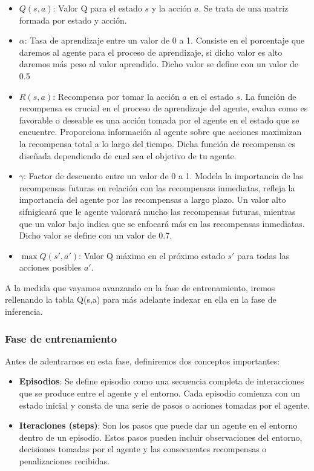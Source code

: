   \begin{itemize}
    \item \textbf{$Q(s, a)$}: Valor Q para el estado $s$ y la acción $a$. Se trata de una matriz formada por estado y acción.
    \item \textbf{$\alpha$}: Tasa de aprendizaje entre un valor de 0 a 1. Consiste en el porcentaje que daremos al agente para el proceso de aprendizaje, 
    si dicho valor es alto daremos más peso al valor aprendido. Dicho valor se define con un valor de 0.5 
    \item \textbf{$R(s, a)$}: Recompensa por tomar la acción $a$ en el estado $s$. La función de recompensa es crucial en el proceso de aprendizaje del agente, evalua como es favorable o deseable
    es una acción tomada por el agente en el estado que se encuentre. Proporciona información al agente sobre que acciones maximizan la recompensa total a lo largo del tiempo. Dicha función
    de recompensa es diseñada dependiendo de cual sea el objetivo de tu agente. 
    \item \textbf{$\gamma$}: Factor de descuento entre un valor de 0 a 1. Modela la importancia de las recompensas futuras en relación con las recompensas inmediatas, refleja la importancia del agente
    por las recompensas a largo plazo. Un valor alto sifnigicará que le agente valorará mucho las recompensas futuras, mientras que un valor bajo indica que se enfocará más en las recompensas
    inmediatas. Dicho valor se define con un valor de 0.7.
    \item \textbf{$\max Q(s', a')$}: Valor Q máximo en el próximo estado $s'$ para todas las acciones posibles $a'$.
\end{itemize}

A la medida que vayamos avanzando en la fase de entrenamiento, iremos rellenando la tabla Q(s,a) para más adelante indexar en ella en la fase de inferencia.

\subsubsection{Fase de entrenamiento}
\label{sec:fases_ql}
 Antes de adentrarnos en esta fase, definiremos dos conceptos importantes:
 \begin{itemize}
  \item \textbf{Episodios}: Se define episodio como una secuencia completa de interacciones que se produce entre el agente y el entorno. Cada episodio comienza con un estado inicial y consta de una serie 
  de pasos o acciones tomadas por el agente.
  \item \textbf{Iteraciones (steps)}: Son los pasos que puede dar un agente en el entorno dentro de un episodio. Estos pasos pueden incluir observaciones del entorno, decisiones tomadas por el agente
  y las consecuentes recompensas o penalizaciones recibidas.
\end{itemize}

